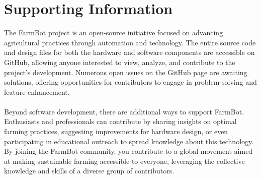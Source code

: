 \section{Supporting Information}
The FarmBot project is an open-source initiative focused on advancing agricultural practices through automation and technology. The entire source code and design files for both the hardware and software components are accessible on GitHub, allowing anyone interested to view, analyze, and contribute to the project's development. Numerous open issues on the GitHub page are awaiting solutions, offering opportunities for contributors to engage in problem-solving and feature enhancement.\\\\
Beyond software development, there are additional ways to support FarmBot. Enthusiasts and professionals can contribute by sharing insights on optimal farming practices, suggesting improvements for hardware design, or even participating in educational outreach to spread knowledge about this technology. By joining the FarmBot community, you contribute to a global movement aimed at making sustainable farming accessible to everyone, leveraging the collective knowledge and skills of a diverse group of contributors.


